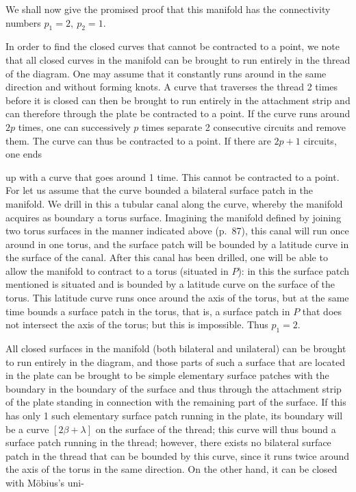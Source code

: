 \documentclass{article}
\begin{document}
We shall now give the promised proof that this manifold has the connectivity numbers $p_1 = 2, \ p_2 = 1$.

In order to find the closed curves that cannot be contracted to a point, we note that all closed curves in the manifold can be brought to run entirely in the thread of the diagram. One may assume that it constantly runs around in the same direction and without forming knots. A curve that traverses the thread 2 times before it is closed can then be brought to run entirely in the attachment strip and can therefore through the plate be contracted to a point. If the curve runs around $2p$ times, one can successively $p$ times separate 2 consecutive circuits and remove them. The curve can thus be contracted to a point. If there are $2p + 1$ circuits, one ends

up with a curve that goes around 1 time. This cannot be contracted to a point. For let us assume that the curve bounded a bilateral surface patch in the manifold. We drill in this a tubular canal along the curve, whereby the manifold acquires as boundary a torus surface. Imagining the manifold defined by joining two torus surfaces in the manner indicated above (p.\ 87), this canal will run once around in one torus, and the surface patch will be bounded by a latitude curve in the surface of the canal. After this canal has been drilled, one will be able to allow the manifold to contract to a torus (situated in $P$): in this the surface patch mentioned is situated and is bounded by a latitude curve on the surface of the torus. This latitude curve runs once around the axis of the torus, but at the same time bounds a surface patch in the torus, that is, a surface patch in $P$ that does not intersect the axis of the torus; but this is impossible. Thus $p_1 = 2$.

All closed surfaces in the manifold (both bilateral and unilateral) can be brought to run entirely in the diagram, and those parts of such a surface that are located in the plate can be brought to be simple elementary surface patches with the boundary in the boundary of the surface and thus through the attachment strip of the plate standing in connection with the remaining part of the surface. If this has only 1 such elementary surface patch running in the plate, its boundary will be a curve $[2\beta + \lambda]$ on the surface of the thread; this curve will thus bound a surface patch running in the thread; however, there exists no bilateral surface patch in the thread that can be bounded by this curve, since it runs twice around the axis of the torus in the same direction. On the other hand, it can be closed with Möbius's uni-
\end{document}
